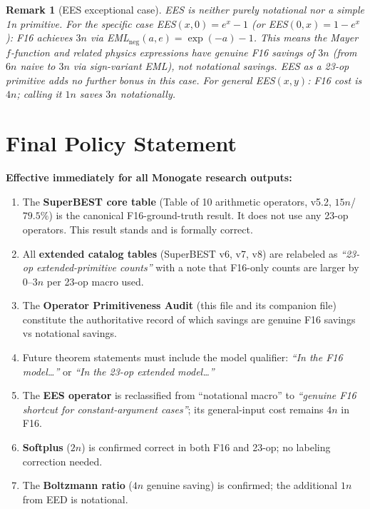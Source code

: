 \documentclass[11pt]{article}
\newtheorem{remark}[theorem]{Remark}
\begin{document}
\begin{remark}[EES exceptional case]
EES is neither purely notational nor a simple 1n primitive.
For the specific case EES$(x,0)=e^x-1$ (or EES$(0,x)=1-e^x$):
F16 achieves $3n$ via EML$_{\mathrm{neg}}(a,e)=\exp(-a)-1$.
This means the Mayer $f$-function and related physics expressions have
\emph{genuine} F16 savings of $3n$ (from $6n$ naive to $3n$ via sign-variant EML),
not notational savings. EES as a 23-op primitive adds no further bonus in this case.
For general EES$(x,y)$: F16 cost is $4n$; calling it $1n$ saves $3n$ notationally.
\end{remark}

\section{Final Policy Statement}

\textbf{Effective immediately for all Monogate research outputs:}

\begin{enumerate}
  \item The \textbf{SuperBEST core table} (Table of 10 arithmetic operators, v5.2, $15n$/$79.5\%$)
    is the canonical F16-ground-truth result. It does not use any 23-op operators.
    This result stands and is formally correct.

  \item All \textbf{extended catalog tables} (SuperBEST v6, v7, v8) are relabeled as
    \emph{``23-op extended-primitive counts''} with a note that F16-only counts are larger
    by $0$--$3n$ per 23-op macro used.

  \item The \textbf{Operator Primitiveness Audit} (this file and its companion file) constitute
    the authoritative record of which savings are genuine F16 savings vs notational savings.

  \item Future theorem statements must include the model qualifier:
    \emph{``In the F16 model\ldots''} or \emph{``In the 23-op extended model\ldots''}

  \item The \textbf{EES operator} is reclassified from ``notational macro'' to
    \emph{``genuine F16 shortcut for constant-argument cases''}; its general-input cost
    remains $4n$ in F16.

  \item \textbf{Softplus} ($2n$) is confirmed correct in both F16 and 23-op; no labeling correction needed.

  \item The \textbf{Boltzmann ratio} ($4n$ genuine saving) is confirmed; the additional $1n$
    from EED is notational.
\end{enumerate}
\end{document}
